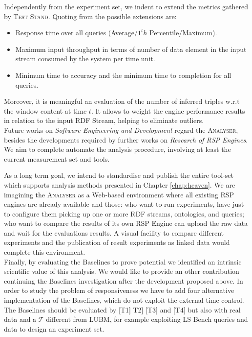 Independently from the experiment set, we indent to extend the metrics gathered by \name \textsc{Test Stand}. Quoting from \cite{DBLP:conf/esws/ScharrenbachUMVB13} the possible extensions are:
\begin{itemize}
\item Response time over all queries (Average/$1^th$ Percentile/Maximum).
\item Maximum input throughput in terms of number of data element in the input stream consumed by the system per time unit.
\item Minimum time to accuracy and the minimum time to completion for all queries.
\end{itemize}

Moreover, it is meaningful an evaluation of the number of inferred triples w.r.t the window content at time $t$. It allows to weight the engine performance results in relation to the input RDF Stream, helping to eliminate outliers.\\



\noindent Future works on \textit{Software Engineering and Development} regard the \textsc{Analyser}, besides the developments required by   further works on \textit{Research of RSP Engines}.  We aim to complete automate the analysis procedure, involving at least the current measurement set and tools. 


As a long term goal, we intend to standardise and publish the entire tool-set which supports analysis methods presented in Chapter \ref{chap:heaven}. We are imagining the \name \textsc{Analyser} as a Web-based environment where all existing RSP engines are already available and those: who want to run experiments, have just to configure them picking up one or more RDF streams, ontologies, and queries; who want to compare the results of its own RSP Engine can upload the raw data and wait for the evaluations results. A visual facility to compare different experiments and the publication of result experiments as linked data would complete this environment. \\


\noindent Finally, by evaluating the Baselines to prove \name potential we identified an intrinsic scientific value of this analysis. We would like to provide an other contribution continuing the Baselines investigation after the development proposed above. In order to study the problem of responsiveness we have to add four alternative implementation of the Baselines, which do not exploit the external time control. The Baselines should be evaluated by [T1] T2] [T3] and [T4] but also with real data and a $\mathcal{T}$ different from LUBM, for example exploiting LS Bench queries and data to design an experiment set. 
